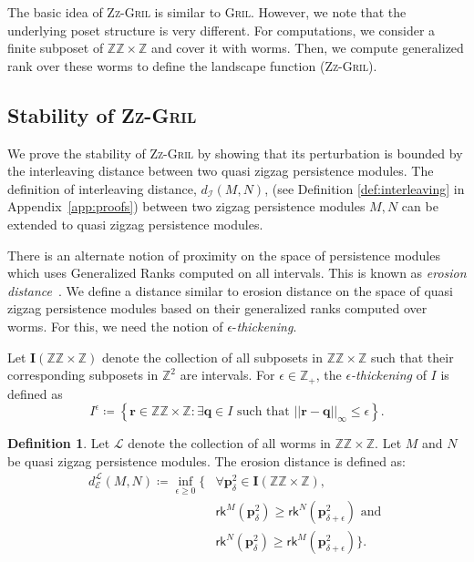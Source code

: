 \documentclass{article}
\newcommand{\gril}{\textsc{Gril}}
\newcommand{\zzgril}{\textsc{Zz-Gril}}
\newcommand{\qzzmod}{quasi zigzag persistence module}
\newcommand{\RKG}{\mathsf{rk}}
\newcommand{\vp}{\mathbf{p}}
\newcommand{\zz}{\mathbb{ZZ}}
\newcommand{\z}{\mathbb{Z}}
\theoremstyle{plain}
\theoremstyle{definition}
\newtheorem{definition}[theorem]{Definition}
\theoremstyle{remark}
\newcommand{\Shreyas}[1]		{{ \textcolor{orange} {S: #1}}}
\begin{document}
The basic idea of \zzgril{} is similar to \gril. However, we note that the underlying poset structure is very different. For computations, we consider a finite subposet of $\zz \times \z$ and cover it with worms. Then, we compute generalized rank over these worms to define the landscape function (\zzgril). 


\subsection{Stability of \zzgril}
We prove the stability of \zzgril{} by showing that its perturbation is bounded by the interleaving distance between two \qzzmod s. The definition of interleaving distance, $d_{\mathcal{I}}(M,N)$, (see Definition \ref{def:interleaving} in Appendix~\ref{app:proofs}) between two zigzag persistence modules $M,N$ can be extended to \qzzmod s. 

There is an alternate notion of proximity on the space of persistence modules which uses Generalized Ranks computed on all intervals. This is known as \emph{erosion distance}~\cite{GenRankKim21}. We define a distance similar to erosion distance on the space of \qzzmod s based on their generalized ranks computed over worms. For this, we need the notion of $\epsilon$-\emph{thickening}.

Let \textbf{I}$(\zz \times \z)$ denote the collection of all subposets in $\zz \times \z$ such that their corresponding subposets in $\z^2$ are intervals. For $\epsilon \in \z_+$, the \emph{$\epsilon$-thickening} of $I$ is defined as 
\begin{equation*}
    I^\epsilon \coloneqq \left \{ \mathbf{r} \in \zz \times \z :\exists\mathbf{q} \in I \text{ such that } ||\mathbf{r} - \mathbf{q}||_\infty \leq \epsilon \right \}.
\end{equation*}

\begin{definition}
    Let $\mathcal{L}$ denote the collection of all worms in $\zz \times \z$. Let $M$ and $N$ be \qzzmod s. The erosion distance is defined as:
    \begin{equation*}
    \begin{split}
        d_\mathcal{E}^\mathcal{L}(M,N) \coloneqq \inf \limits_{\epsilon \geq 0} 
        \{ & \forall \boxed{\vp}^2_\delta \in \textbf{I}(\zz \times \z), \\
        & \RKG^M\left (\boxed{\vp}^2_\delta\right) \geq \RKG^N\left(\boxed{\vp}^2_{\delta+\epsilon}\right ) \text{ and } \\
        & \RKG^N\left (\boxed{\vp}^2_\delta\right ) \geq \RKG^M\left (\boxed{\vp}^2_{\delta+\epsilon}\right)  \}.
    \end{split}
    \end{equation*}
\end{definition}
\end{document}
